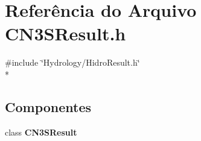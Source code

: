 \section{Referência do Arquivo C\+N3\+S\+Result.\+h}
\label{_c_n3_s_result_8h}
{\ttfamily \#include \char`\"{}Hydrology/\+Hidro\+Result.\+h\char`\"{}}\\*
\subsection*{Componentes}
\begin{DoxyCompactItemize}
\item 
class {\bf C\+N3\+S\+Result}
\end{DoxyCompactItemize}
